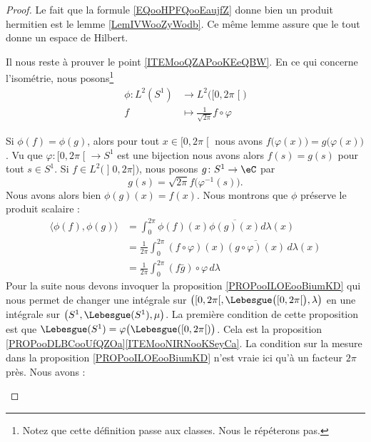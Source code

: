 \begin{proof}
	Le fait que la formule \eqref{EQooHPFQooEaujfZ} donne bien un produit hermitien est le lemme \ref{LemIVWooZyWodb}. Ce même lemme assure que le tout donne un espace de Hilbert.

	Il nous reste à prouver le point \ref{ITEMooQZAPooKEeQBW}. En ce qui concerne l'isométrie, nous posons\footnote{Notez que cette définition passe aux classes. Nous le répéterons pas.}
	\begin{equation}
		\begin{aligned}
			\phi\colon L^2(S^1) & \to L^2\big( \mathopen[ 0 , 2\pi \mathclose[ \big) \\
			f                   & \mapsto \frac{1}{ \sqrt{ 2\pi } }f\circ \varphi
		\end{aligned}
	\end{equation}
	\begin{subproof}
		\spitem[Injection]
		Si \( \phi(f)=\phi(g)\), alors pour tout \( x\in\mathopen[ 0 , 2\pi \mathclose[\) nous avons \( f\big( \varphi(x) \big)=g\big( \varphi(x) \big)\). Vu que \( \varphi\colon \mathopen[ 0 , 2\pi \mathclose[\to S^1\) est une bijection nous avons alors \( f(s)=g(s)\) pour tout \( s\in S^1\).
		\spitem[Surjection]
		Si \( f\in L^2\big( \mathopen] 0 , 2\pi \mathclose] \big)\), nous posons \( g\colon S^1\to \eC\) par
		\begin{equation}
			g(s)=\sqrt{ 2\pi }f\big( \varphi^{-1}(s) \big).
		\end{equation}
		Nous avons alors bien \( \phi(g)(x)=f(x)\).
		\spitem[Isométrie]
		Nous montrons que \( \phi\) préserve le produit scalaire :
		\begin{subequations}        \label{SUBEQSooRYYHooPcLXHN}
			\begin{align}
				\langle \phi(f), \phi(g)\rangle & =\int_0^{2\pi}\phi(f)(x)\overline{ \phi(g)(x) }d\lambda(x)                                   \\
				                                & =\frac{1}{ 2\pi }\int_0^{2\pi}(f\circ\varphi)(x)\overline{ (g\circ\varphi)(x) }\,d\lambda(x) \\
				                                & =\frac{1}{ 2\pi }\int_0^{2\pi}(f\bar g)\circ\varphi\, d\lambda
			\end{align}
		\end{subequations}
		Pour la suite nous devons invoquer la proposition \ref{PROPooILOEooBiumKD} qui nous permet de changer une intégrale sur \( \big( \mathopen[ 0 , 2\pi \mathclose[,\Lebesgue\big( \mathopen[ 0 , 2\pi \mathclose[ \big),\lambda \big)\) en une intégrale sur \( \big( S^1,\Lebesgue(S^1), \mu \big)\). La première condition de cette proposition est que \( \Lebesgue(S^1)=\varphi\big( \Lebesgue(\mathopen[ 0 , 2\pi \mathclose[) \big)\). Cela est la proposition \ref{PROPooDLBCooUfQZOa}\ref{ITEMooNIRNooKSeyCa}. La condition sur la mesure dans la proposition \ref{PROPooILOEooBiumKD} n'est vraie ici qu'à un facteur \( 2\pi\) près. Nous avons :

\end{subproof}
\end{proof}
